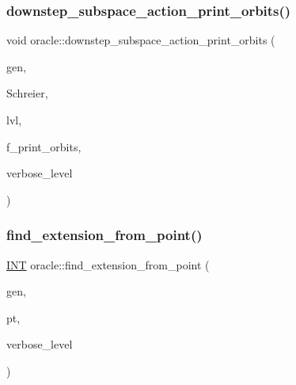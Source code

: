 \subsubsection{\texorpdfstring{downstep\+\_\+subspace\+\_\+action\+\_\+print\+\_\+orbits()}{downstep\_subspace\_action\_print\_orbits()}}
{\footnotesize\ttfamily void oracle\+::downstep\+\_\+subspace\+\_\+action\+\_\+print\+\_\+orbits (\begin{DoxyParamCaption}\item[{\mbox{\hyperlink{classgenerator}{generator}} $\ast$}]{gen,  }\item[{\mbox{\hyperlink{classschreier}{schreier}} \&}]{Schreier,  }\item[{\mbox{\hyperlink{galois_8h_a09fddde158a3a20bd2dcadb609de11dc}{I\+NT}}}]{lvl,  }\item[{\mbox{\hyperlink{galois_8h_a09fddde158a3a20bd2dcadb609de11dc}{I\+NT}}}]{f\+\_\+print\+\_\+orbits,  }\item[{\mbox{\hyperlink{galois_8h_a09fddde158a3a20bd2dcadb609de11dc}{I\+NT}}}]{verbose\+\_\+level }\end{DoxyParamCaption})}

\mbox{\label{classoracle_aa6091b5a2260435d706a61ddc06ad1a4}} 
\subsubsection{\texorpdfstring{find\+\_\+extension\+\_\+from\+\_\+point()}{find\_extension\_from\_point()}}
{\footnotesize\ttfamily \mbox{\hyperlink{galois_8h_a09fddde158a3a20bd2dcadb609de11dc}{I\+NT}} oracle\+::find\+\_\+extension\+\_\+from\+\_\+point (\begin{DoxyParamCaption}\item[{\mbox{\hyperlink{classgenerator}{generator}} $\ast$}]{gen,  }\item[{\mbox{\hyperlink{galois_8h_a09fddde158a3a20bd2dcadb609de11dc}{I\+NT}}}]{pt,  }\item[{\mbox{\hyperlink{galois_8h_a09fddde158a3a20bd2dcadb609de11dc}{I\+NT}}}]{verbose\+\_\+level }\end{DoxyParamCaption})}

\mbox{\label{classoracle_a29c6e823f3246d61a0f8c0f18f13c6df}} 
